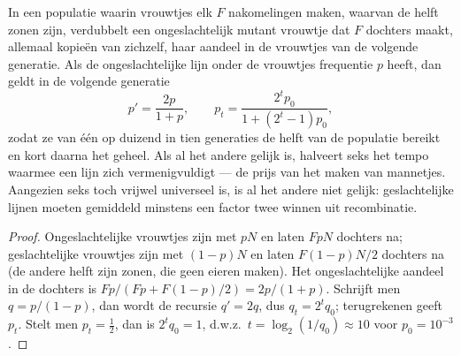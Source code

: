 \begin{theorem}\label{thm:b2:asexual-reproduction:twofold}
In een populatie waarin vrouwtjes elk $F$ nakomelingen maken, waarvan de
helft zonen zijn, verdubbelt een ongeslachtelijk mutant vrouwtje dat $F$
dochters maakt, allemaal kopieën van zichzelf, haar aandeel in de
vrouwtjes van de volgende generatie. Als de ongeslachtelijke lijn onder de
vrouwtjes frequentie $p$ heeft, dan geldt in de volgende generatie
\[
p' = \frac{2p}{1 + p}, \qquad p_t = \frac{2^t p_0}{1 + (2^t - 1)p_0},
\]
zodat ze van één op duizend in tien generaties de helft van de populatie
bereikt en kort daarna het geheel. Als al het andere gelijk is, halveert
seks het tempo waarmee een lijn zich vermenigvuldigt --- de prijs van het
maken van mannetjes. Aangezien seks toch vrijwel universeel is, is al het
andere niet gelijk: geslachtelijke lijnen moeten gemiddeld minstens een
factor twee winnen uit recombinatie.
\end{theorem}
\begin{proof}
Ongeslachtelijke vrouwtjes zijn met $pN$ en laten $FpN$ dochters na;
geslachtelijke vrouwtjes zijn met $(1 - p)N$ en laten $F(1 - p)N/2$
dochters na (de andere helft zijn zonen, die geen eieren maken). Het
ongeslachtelijke aandeel in de dochters is $Fp/(Fp + F(1 - p)/2) = 2p/(1 + p)$.
Schrijft men $q = p/(1 -
p)$, dan wordt de recursie $q' = 2q$, dus $q_t = 2^t q_0$; terugrekenen
geeft $p_t$. Stelt men $p_t = \tfrac12$, dan is $2^t q_0 = 1$, d.w.z.\
$t = \log_2(1/q_0) \approx 10$ voor $p_0 = 10^{-3}$.
\end{proof}

